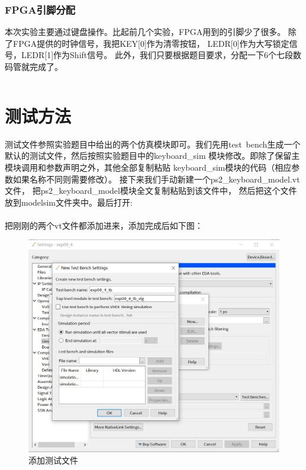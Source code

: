 \documentclass[12pt,a4paper,UTF8]{article}
\begin{document}
\subsubsection{FPGA引脚分配}
本次实验主要通过键盘操作。比起前几个实验，FPGA用到的引脚少了很多。
除了FPGA提供的时钟信号，我把\mbox{KEY[0]}作为清零按钮，
\mbox{LEDR[0]}作为大写锁定信号，\mbox{LEDR[1]}作为Shift信号。
此外，我们只要根据题目要求，分配一下6个七段数码管就完成了。

\begin{lstlisting}[style=verilog-style]
\end{lstlisting}

\section{测试方法}
测试文件参照实验题目中给出的两个仿真模块即可。我们先用\mbox{test bench}\linebreak[4]
生成一个默认的测试文件，然后按照实验题目中的\mbox{keyboard\_sim}
模块修改。即除了保留主模块调用和参数声明之外，其他全部复制粘贴
\mbox{keyboard\_sim}模块的代码（相应参数如果名称不同则需要修改）。
接下来我们手动新建一个\mbox{ps2\_keyboard\_model.vt}文件，
把\mbox{ps2\_keyboard\_model}模块全文复制粘贴到该文件中，
然后把这个文件放到modelsim文件夹中。最后打开:\\
\\
把刚刚的两个vt文件都添加进来，添加完成后如下图：
\begin{figure}[H]
  \centering
  \includegraphics[width=1\textwidth]{sim_settings.JPG}
  \caption{添加测试文件}
  \label{set}
\end{figure}
\end{document}
